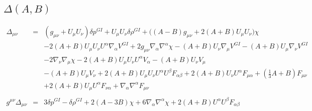 \documentclass[10pt,letterpaper]{article}
\numberwithin{equation}{section}
\begin{document}
\subsection{$\Delta(A,B)$}
%
\begin{eqnarray}
\Delta_{\mu\nu}&=& (g_{\mu \nu } + U_{\mu } U_{\nu }) \delta p^{GI}{} + U_{\mu } U_{\nu } \delta \rho^{GI}{} + \bigl((A -  B) g_{\mu \nu } + 2 (A + B) U_{\mu } U_{\nu }\bigr) \chi \nonumber \\ 
&& - 2 (A + B) U_{\mu } U_{\nu } U^{\alpha } \nabla_{\alpha }V^{GI}{} + 2 g_{\mu \nu } \nabla_{\alpha }\nabla^{\alpha }\chi -  (A + B) U_{\nu } \nabla_{\mu }V^{GI}{} -  (A + B) U_{\mu } \nabla_{\nu }V^{GI}{} \nonumber \\ 
&& - 2 \nabla_{\nu }\nabla_{\mu }\chi -2 (A + B) U_{\mu } U_{\nu } U^{\alpha } V_{\alpha } -  (A + B) U_{\nu } V_{\mu } \nonumber \\ 
&& -  (A + B) U_{\mu } V_{\nu }+2 (A + B) U_{\mu } U_{\nu } U^{\alpha } U^{\beta } F_{\alpha \beta } + 2 (A + B) U_{\nu } U^{\alpha } F_{\mu \alpha } + (\tfrac{1}{3} A + B) F_{\mu \nu } \nonumber \\ 
&& + 2 (A + B) U_{\mu } U^{\alpha } F_{\nu \alpha } + \nabla_{\alpha }\nabla^{\alpha }F_{\mu \nu }
\\  \nonumber\\ 
g^{\mu\nu}\Delta_{\mu\nu}&=& 3 \delta p^{GI}{} -  \delta \rho^{GI}{} + 2 (A - 3 B) \chi + 6 \nabla_{\alpha }\nabla^{\alpha }\chi +2 (A + B) U^{\alpha } U^{\beta } F_{\alpha \beta }
\end{eqnarray}
\\ \\
%
%
\end{document}
